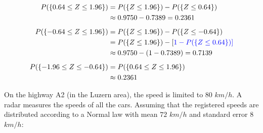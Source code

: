 \documentclass[smaller]{beamer}\usepackage[]{graphicx}\usepackage[]{color}
\begin{document}
\begin{frame}{\secname}

  \begin{example}[continued]
  \begin{footnotesize}
  \begin{align*}
  P(\{0.64\leq Z\leq 1.96\}) &= P(\{Z\leq 1.96\})-P(\{Z\leq 0.64\})\\
  & \approx 0.9750-0.7389=0.2361\\[0.5em]
  P(\{-0.64\leq Z\leq 1.96\}) &= P(\{Z\leq 1.96\})-P(\{Z\leq -0.64\})\\
  &=P(\{Z\leq 1.96\})-[\color{blue}{1-P(\{Z\leq 0.64\})}] \\
  &\approx 0.9750-(1-0.7389)=0.7139  \\[0.5em]
  P(\{-1.96\leq Z\leq -0.64\}) &= P(\{0.64\leq Z\leq 1.96\}) \\
  &\approx 0.2361
  \end{align*}
  \end{footnotesize}
  \end{example}
\end{frame}%

\begin{frame}{\secname}

\begin{example}
\begin{footnotesize}
    On the highway A2 (in the Luzern area), the speed is limited to $80$ $km/h$. A radar measures the speeds of all the cars.
    Assuming that the registered speeds are distributed according to a Normal law with mean $72$ $km/h$ and standard error $8$ $km/h$: \vspace{0.2cm}



\end{footnotesize}
\end{example}
\end{frame}
\end{document}
